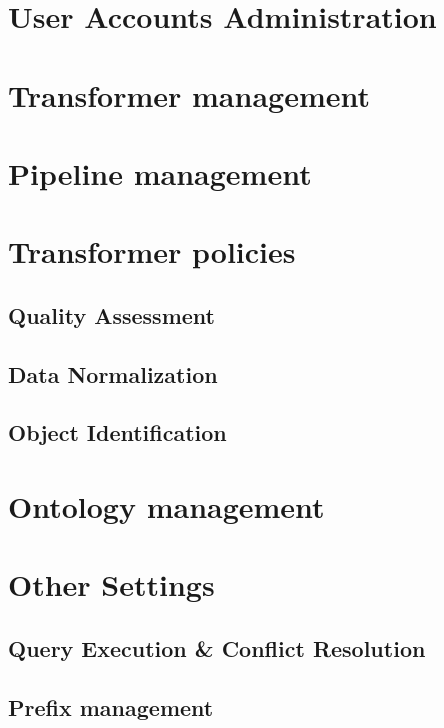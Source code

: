\section{User Accounts Administration}

\section{Transformer management}

\section{Pipeline management}

\section{Transformer policies}

\subsection*{Quality Assessment}

\subsection*{Data Normalization}

\subsection*{Object Identification}

\section{Ontology management}

\section{Other Settings}

\subsection*{Query Execution \& Conflict Resolution}

\subsection*{Prefix management}



